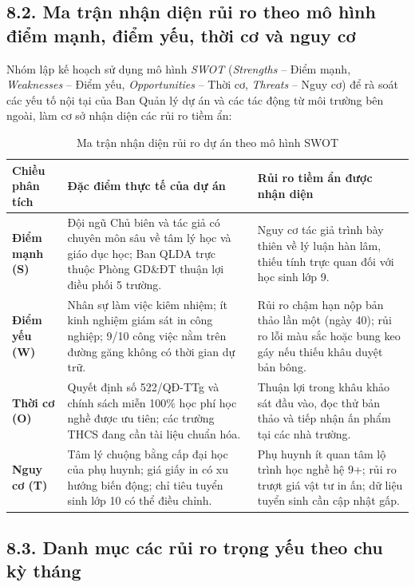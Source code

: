 \subsection{8.2. Ma trận nhận diện rủi ro theo mô hình điểm mạnh, điểm yếu, thời cơ và nguy cơ}

Nhóm lập kế hoạch sử dụng mô hình \textit{SWOT} (\textit{Strengths} -- Điểm mạnh, \textit{Weaknesses} -- Điểm yếu, \textit{Opportunities} -- Thời cơ, \textit{Threats} -- Nguy cơ) để rà soát các yếu tố nội tại của Ban Quản lý dự án và các tác động từ môi trường bên ngoài, làm cơ sở nhận diện các rủi ro tiềm ẩn:

\begin{table}[htbp]
\centering
\caption{Ma trận nhận diện rủi ro dự án theo mô hình SWOT}
\label{tab:swot}
\small
{}
\begin{tabularx}{\textwidth}{|p{2.8cm}|Y|Y|}
\hline
\textbf{Chiều phân tích} & \textbf{Đặc điểm thực tế của dự án} & \textbf{Rủi ro tiềm ẩn được nhận diện} \\
\hline
\textbf{Điểm mạnh (S)} & Đội ngũ Chủ biên và tác giả có chuyên môn sâu về tâm lý học và giáo dục học; Ban QLDA trực thuộc Phòng GD\&ĐT thuận lợi điều phối 5 trường. & Nguy cơ tác giả trình bày thiên về lý luận hàn lâm, thiếu tính trực quan đối với học sinh lớp 9. \\
\hline
\textbf{Điểm yếu (W)} & Nhân sự làm việc kiêm nhiệm; ít kinh nghiệm giám sát in công nghiệp; 9/10 công việc nằm trên đường găng không có thời gian dự trữ. & Rủi ro chậm hạn nộp bản thảo lần một (ngày 40); rủi ro lỗi màu sắc hoặc bung keo gáy nếu thiếu khâu duyệt bản bông. \\
\hline
\textbf{Thời cơ (O)} & Quyết định số 522/QĐ-TTg và chính sách miễn 100\% học phí học nghề được ưu tiên; các trường THCS đang cần tài liệu chuẩn hóa. & Thuận lợi trong khâu khảo sát đầu vào, đọc thử bản thảo và tiếp nhận ấn phẩm tại các nhà trường. \\
\hline
\textbf{Nguy cơ (T)} & Tâm lý chuộng bằng cấp đại học của phụ huynh; giá giấy in có xu hướng biến động; chỉ tiêu tuyển sinh lớp 10 có thể điều chỉnh. & Phụ huynh ít quan tâm lộ trình học nghề hệ 9+; rủi ro trượt giá vật tư in ấn; dữ liệu tuyển sinh cần cập nhật gấp. \\
\hline
\end{tabularx}
\end{table}

\subsection{8.3. Danh mục các rủi ro trọng yếu theo chu kỳ tháng}

